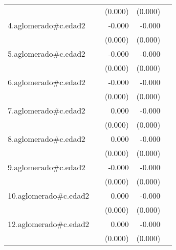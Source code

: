 {\begin{longtable}{l*{4}{D{.}{.}{-1}}}
            &                     &     (0.000)         &     (0.000)         &                     \\
\addlinespace
4.aglomerado#c.edad2&                     &      -0.000         &      -0.000\sym{**} &                     \\
            &                     &     (0.000)         &     (0.000)         &                     \\
\addlinespace
5.aglomerado#c.edad2&                     &      -0.000         &      -0.000\sym{**} &                     \\
            &                     &     (0.000)         &     (0.000)         &                     \\
\addlinespace
6.aglomerado#c.edad2&                     &      -0.000         &      -0.000\sym{***}&                     \\
            &                     &     (0.000)         &     (0.000)         &                     \\
\addlinespace
7.aglomerado#c.edad2&                     &       0.000         &      -0.000         &                     \\
            &                     &     (0.000)         &     (0.000)         &                     \\
\addlinespace
8.aglomerado#c.edad2&                     &       0.000         &      -0.000         &                     \\
            &                     &     (0.000)         &     (0.000)         &                     \\
\addlinespace
9.aglomerado#c.edad2&                     &      -0.000         &      -0.000\sym{*}  &                     \\
            &                     &     (0.000)         &     (0.000)         &                     \\
\addlinespace
10.aglomerado#c.edad2&                     &       0.000         &      -0.000         &                     \\
            &                     &     (0.000)         &     (0.000)         &                     \\
\addlinespace
12.aglomerado#c.edad2&                     &       0.000         &      -0.000         &                     \\
            &                     &     (0.000)         &     (0.000)         &                     \\

\end{longtable}}
